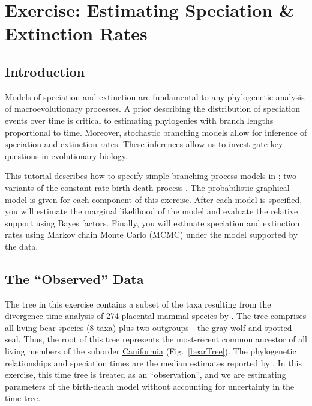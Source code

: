\section{Exercise: Estimating Speciation \& Extinction Rates}

\subsection{Introduction}

Models of speciation and extinction are fundamental to any phylogenetic analysis of macroevolutionary processes.
A prior describing the distribution of speciation events over time is critical to estimating phylogenies with branch lengths proportional to time.
Moreover, stochastic branching models allow for inference of speciation and extinction rates.
These inferences allow us to investigate key questions in evolutionary biology.

This tutorial describes how to specify simple branching-process models in \RevBayes;
two variants of the constant-rate birth-death process \citep{Yule1924,Kendall1948,Thompson1975,Nee1994,Rannala1996,Yang1997}.
The probabilistic graphical model is given for each component of this exercise.
After each model is specified, you will estimate the marginal likelihood of the model and evaluate the relative support using Bayes factors.
Finally, you will estimate speciation and extinction rates using Markov chain Monte Carlo (MCMC) under the model supported by the data.


\subsection{The ``Observed'' Data}


The tree in this exercise contains a subset of the taxa resulting from the divergence-time analysis of 274 placental mammal species by \citet{dosReis2012}. 
The tree comprises all living bear species (8 taxa) plus two outgroups---the gray wolf and spotted seal.
Thus, the root of this tree represents the most-recent common ancestor of all living members of the suborder \href{http://en.wikipedia.org/wiki/Caniformia}{Caniformia} (Fig.~\ref{bearTree}). 
The phylogenetic relationships and speciation times are the median estimates reported by \citet{dosReis2012}. 
In this exercise, this time tree is treated as an ``observation'', and we are estimating parameters of the birth-death model without accounting for uncertainty in the time tree.

